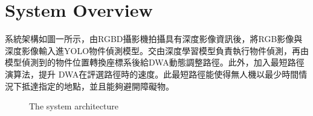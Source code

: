 \documentclass[crop=false]{standalone}
\begin{document}
	\section{System Overview}
	
	系統架構如圖一所示，由RGBD攝影機拍攝具有深度影像資訊後，將RGB影像與深度影像輸入進YOLO物件偵測模型。交由深度學習模型負責執行物件偵測，再由模型偵測到的物件位置轉換座標系後給DWA動態調整路徑。此外，加入最短路徑演算法，提升 DWA在評選路徑時的速度。此最短路徑能使得無人機以最少時間情況下抵達指定的地點，並且能夠避開障礙物。
	
	\begin{figure*}[thbp!]
		\centering
		\caption{The system architecture}
		\label{fig:system}
	\end{figure*}
\end{document}
